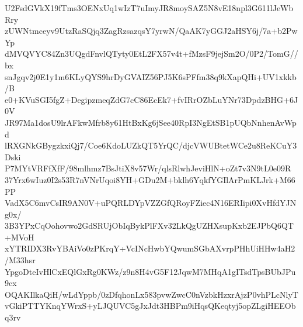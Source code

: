 U2FsdGVkX19fTms3OENxUq1wIzT7uImyJR8moySAZ5N8vE18npl3G611lJeWbRry
zUWNtmceyv9UtzRaSQjq3ZagRzsazqsY7yrwN/QaAK7yGGJ2aHSY6j/7a+b2PwYp
dMVQVYC84Zn3UQgdFnvlQTyty0EtL2FX57v4t+fMzsF9jejSm2O/0P2/TomG//bx
snJgqv2j0E1y1m6KLyQYS9hrDyGVAIZ56PJ5K6sPFfm38q9kXapQHi+UV1xkkb/B
e0+KVuSGI5fgZ+DegipzmeqZdG7cC86EcEk7+fvIRrOZbLuYNr73DpdzBHG+6J0V
JR97Ma1dosU9lrAFkwMfrb8y61HtBxKg6jSee40RpI3NgEtSB1pUQbNnhenAvWpd
lRXGNkGBygzkxiQj7/Coe6KdoLUZkQT5YrQC/djcVWUBtetWCe2u8ReKCuY3Dski
P7MYtVRFfXfF/98mlhmz7BsJtiX8v57Wr/qlsRlwhJeviHlN+oZt7v3N9tL0e09R
37Yrx6wIuz0I2s53R7nVNrUqoi8YH+GDu2M+bklh6YqkfYGIlArPmKLJrk+M66PP
VadX5C6mvCsIR9AN0V+uPQRLDYpVZZGfQRoyFZiec4N16ERIipi0XvHfdYJNg0x/
3B3YPxCqOohovwo2GdSRUjObIqBykPlFXv32LkQgUZHXsupKxb2EJPbQ6QT+MVoH
xYTRIDX3RvYBAiVo0zPKrqY+VcINcHwbYQwumSGbAXvrpPHhUiHHw4aH2/M33hsr
YpgoDteIvHlCxEQlGxRg0KWz/z9n8H4vG5F12JqwM7MHqA1gITsdTpsBUbJPu9cx
OQAKIlkaQiH/wLdYppb/0zDfqhonLx583pvwZwcC0nVzbkHzxrAjzP0vhPLcNlyT
vGkiPTTYKnqYWrxS+yLJQUVC5gJxJdt3HBPm9iHqsQKeqtyj5opZLgiHEEObq3rv
